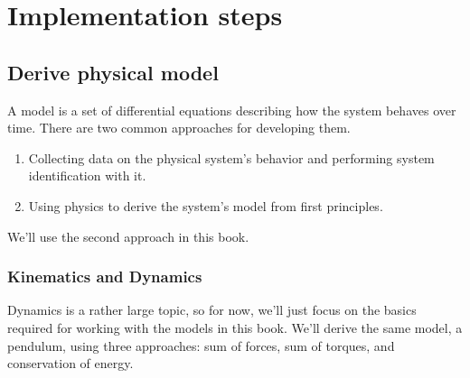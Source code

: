 
\chapter{Implementation steps} \label{ch:implementation-steps}

\section{Derive physical model}

A \gls{model} is a set of differential equations describing how the system
behaves over time. There are two common approaches for developing them.

\begin{enumerate}
  \item Collecting data on the physical system's behavior and performing system
  identification with it.
  \item Using physics to derive the system's model from first principles.
\end{enumerate}

We'll use the second approach in this book.

\subsection{Kinematics and Dynamics}

Dynamics is a rather large topic, so for now, we'll just focus on the basics
required for working with the models in this book. We'll derive the same model,
a pendulum, using three approaches: sum of forces, sum of torques, and
conservation of energy.

